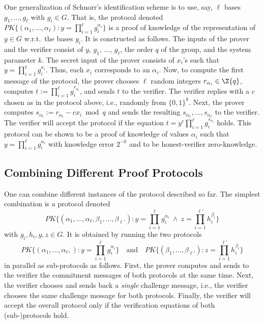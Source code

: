 One generalization of Schnorr's identification scheme is to use, say, $\ell$ bases
$g_1, \ldots, g_\ell$  with $g_i \in G $.
That is, the protocol denoted $\textit{PK}\{(\alpha_1,\ldots, \alpha_\ell): y = 
\prod_{i =1}^{\ell}g_i^{\alpha_i}  \}$
is a proof of knowledge of the representation of $y \in G$ w.r.t.\ the bases $g_i$.
It is constructed as follows.
The inputs of the prover and the verifier consist of $y$, $g_1$, $\ldots$, $g_\ell$,  the order $q$
of the group, and the system parameter $k$.
The secret input of the prover consists of $x_i$'s  such that
$y = \prod_{i =1}^{\ell}g_i^{x_i}$.
Thus, each $x_i$ corresponds to an $\alpha_i$.
Now, to compute the 
first message of the protocol, the prover chooses $\ell$ random
integers $r_{\alpha_i} \in \Z{q}$,
computes $t := \prod_{i =1}^{\ell}g_i^{r_{\alpha_i}}$, and 
sends $t$ to the verifier.
The verifier replies with a  $c$ chosen as in the protocol above, i.e., randomly
from $\{0,1\}^k$.
Next, the prover computes
$s_{\alpha_i}  := r_{\alpha_i} - c x_{i} \bmod{q}$ and sends the resulting
$s_{\alpha_1},\ldots,s_{\alpha_\ell}$ to the verifier.
The verifier will accept the protocol if the equation 
$t = y^{c} \prod_{i =1}^{\ell}g_i^{s_{\alpha_i}}$
holds.
This protocol can be shown to be a proof of knowledge of values
$\alpha_i$ such that $ y =  \prod_{i =1}^{\ell}g_i^{\alpha_i}$
with knowledge error $2^{-k}$ and to be honest-verifier
zero-knowledge.

\subsection{Combining Different Proof Protocols}
\label{Combining Different Proof Protocols}

One can combine different instances of the protocol described so far.
The simplest combination is a protocol denoted  
\[
\textit{PK}\{(\alpha_1,\ldots, \alpha_\ell, \beta_1,\ldots, \beta_{\ell'} ): y = \prod_{i =1}^{\ell} g_i^{\alpha_i} 
\ \wedge \ z = \prod_{i =1}^{\ell'} h_i^{\beta_i}  \}
\]
with $g_i,h_i,y,z \in G$.
It is obtained by running the two protocols 
\[\textit{PK}\{(\alpha_1,\ldots, \alpha_\ell,  ): y = \prod_{i =1}^{\ell} g_i^{\alpha_i}  \}
\quad \text{and} \quad
\textit{PK}\{(\beta_1,\ldots, \beta_{\ell'} ): 
 z = \prod_{i =1}^{\ell'} h_i^{\beta_i}  \}
\]
in parallel as sub-protocols as follows. 
First, the prover computes and  sends to the verifier
the commitment messages of both protocols at the same time.
Next, the verifier chooses and sends back a \emph{single} challenge message,
i.e., the verifier chooses the same challenge message for both protocols.
Finally, the verifier will accept the overall protocol only if the
verification equations of both (sub-)protocols hold.

